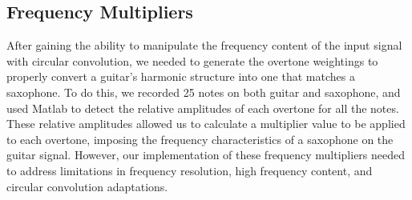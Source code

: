 \documentclass[12pt]{article}
\begin{document}
\subsection{Frequency Multipliers}
After gaining the ability to manipulate the frequency content of the input signal with circular convolution, we needed to generate the overtone weightings to properly convert a guitar's harmonic structure into one that matches a saxophone. To do this, we recorded 25 notes on both guitar and saxophone, and used Matlab to detect the relative amplitudes of each overtone for all the notes. These relative amplitudes allowed us to calculate a multiplier value to be applied to each overtone, imposing the frequency characteristics of a saxophone on the guitar signal. However, our implementation of these frequency multipliers needed to address limitations in frequency resolution, high frequency content, and circular convolution adaptations.
\end{document}

